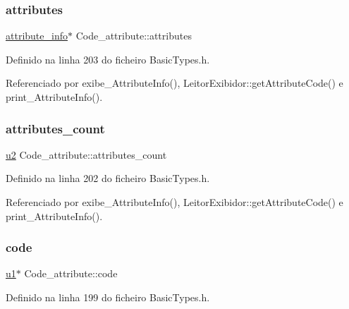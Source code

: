 \subsubsection{\texorpdfstring{attributes}{attributes}}
{\footnotesize\ttfamily \hyperlink{structattribute__info}{attribute\+\_\+info}$\ast$ Code\+\_\+attribute\+::attributes}



Definido na linha 203 do ficheiro Basic\+Types.\+h.



Referenciado por exibe\+\_\+\+Attribute\+Info(), Leitor\+Exibidor\+::get\+Attribute\+Code() e print\+\_\+\+Attribute\+Info().

\mbox{\label{structCode__attribute_a9ca1435aa65ae02d764ff53a36fb842f}} 
\subsubsection{\texorpdfstring{attributes\+\_\+count}{attributes\_count}}
{\footnotesize\ttfamily \hyperlink{BasicTypes_8h_a732cde1300aafb73b0ea6c2558a7a54f}{u2} Code\+\_\+attribute\+::attributes\+\_\+count}



Definido na linha 202 do ficheiro Basic\+Types.\+h.



Referenciado por exibe\+\_\+\+Attribute\+Info(), Leitor\+Exibidor\+::get\+Attribute\+Code() e print\+\_\+\+Attribute\+Info().

\mbox{\label{structCode__attribute_a26d83aeded05528b11dd486555d1ece2}} 
\subsubsection{\texorpdfstring{code}{code}}
{\footnotesize\ttfamily \hyperlink{BasicTypes_8h_ad9f4cdb6757615aae2fad89dab3c5470}{u1}$\ast$ Code\+\_\+attribute\+::code}



Definido na linha 199 do ficheiro Basic\+Types.\+h.



